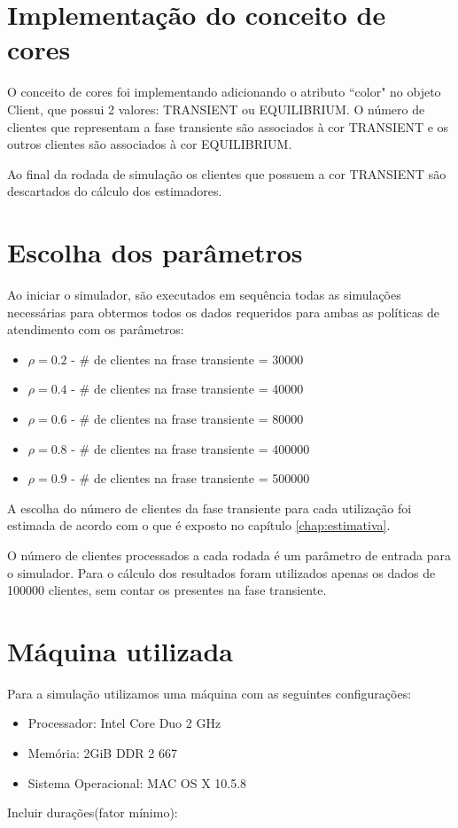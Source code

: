 \section{Implementação do conceito de cores}
O conceito de cores foi implementando adicionando o atributo ``color" no objeto Client, que possui 2 valores: TRANSIENT ou EQUILIBRIUM.  O número de clientes que representam a fase transiente são associados à cor TRANSIENT e os outros clientes são associados à cor EQUILIBRIUM.

Ao final da rodada de simulação os clientes que possuem a cor TRANSIENT são descartados do cálculo dos estimadores.

\section{Escolha dos parâmetros}
\label{sec:parametros}
Ao iniciar o simulador, são executados em sequência todas as simulações necessárias para obtermos todos os dados requeridos para ambas as políticas de atendimento com os parâmetros:
\begin{itemize}
  \item $\rho=0.2$ - \# de clientes na frase transiente = 30000
  \item $\rho=0.4$ - \# de clientes na frase transiente = 40000
  \item $\rho=0.6$ - \# de clientes na frase transiente = 80000
  \item $\rho=0.8$ - \# de clientes na frase transiente = 400000
  \item $\rho=0.9$ - \# de clientes na frase transiente = 500000
\end{itemize}

A escolha do número de clientes da fase transiente para cada utilização foi estimada de acordo com o que é exposto no capítulo \ref{chap:estimativa}.

O número de clientes processados a cada rodada é um parâmetro de entrada para o simulador. Para o cálculo dos resultados foram utilizados apenas os dados de 100000 clientes, sem contar os presentes na fase transiente.

\section{Máquina utilizada}
Para a simulação utilizamos uma máquina com as seguintes configurações:
\begin{itemize}
  \item Processador: Intel Core Duo 2 GHz 
  \item Memória: 2GiB DDR 2 667
  \item Sistema Operacional: MAC OS X 10.5.8
\end{itemize}

Incluir durações(fator mínimo):
